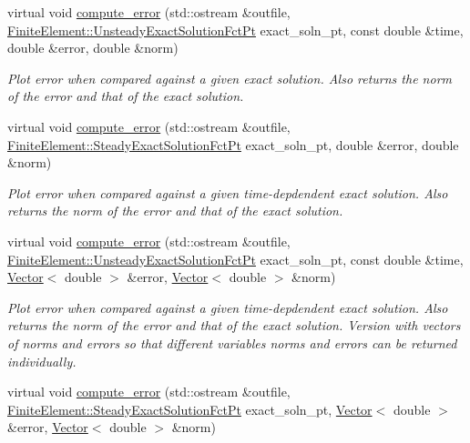 \begin{DoxyCompactItemize}
virtual void \hyperlink{classoomph_1_1Mesh_a7ccc8ea627c4aaeace90c78365b7ea30}{compute\+\_\+error} (std\+::ostream \&outfile, \hyperlink{classoomph_1_1FiniteElement_ad4ecf2b61b158a4b4d351a60d23c633e}{Finite\+Element\+::\+Unsteady\+Exact\+Solution\+Fct\+Pt} exact\+\_\+soln\+\_\+pt, const double \&time, double \&error, double \&norm)
\begin{DoxyCompactList}\small\item\em Plot error when compared against a given exact solution. Also returns the norm of the error and that of the exact solution. \end{DoxyCompactList}\item 
virtual void \hyperlink{classoomph_1_1Mesh_a9488e849a82ef1fc4971013e3661a1ce}{compute\+\_\+error} (std\+::ostream \&outfile, \hyperlink{classoomph_1_1FiniteElement_a690fd33af26cc3e84f39bba6d5a85202}{Finite\+Element\+::\+Steady\+Exact\+Solution\+Fct\+Pt} exact\+\_\+soln\+\_\+pt, double \&error, double \&norm)
\begin{DoxyCompactList}\small\item\em Plot error when compared against a given time-\/depdendent exact solution. Also returns the norm of the error and that of the exact solution. \end{DoxyCompactList}\item 
virtual void \hyperlink{classoomph_1_1Mesh_a13e54320a2c859f9085a8ecd01cc72f0}{compute\+\_\+error} (std\+::ostream \&outfile, \hyperlink{classoomph_1_1FiniteElement_ad4ecf2b61b158a4b4d351a60d23c633e}{Finite\+Element\+::\+Unsteady\+Exact\+Solution\+Fct\+Pt} exact\+\_\+soln\+\_\+pt, const double \&time, \hyperlink{classoomph_1_1Vector}{Vector}$<$ double $>$ \&error, \hyperlink{classoomph_1_1Vector}{Vector}$<$ double $>$ \&norm)
\begin{DoxyCompactList}\small\item\em Plot error when compared against a given time-\/depdendent exact solution. Also returns the norm of the error and that of the exact solution. Version with vectors of norms and errors so that different variables\textquotesingle{} norms and errors can be returned individually. \end{DoxyCompactList}\item 
virtual void \hyperlink{classoomph_1_1Mesh_aaf01468aaed8c208faa4bdb474b9519e}{compute\+\_\+error} (std\+::ostream \&outfile, \hyperlink{classoomph_1_1FiniteElement_a690fd33af26cc3e84f39bba6d5a85202}{Finite\+Element\+::\+Steady\+Exact\+Solution\+Fct\+Pt} exact\+\_\+soln\+\_\+pt, \hyperlink{classoomph_1_1Vector}{Vector}$<$ double $>$ \&error, \hyperlink{classoomph_1_1Vector}{Vector}$<$ double $>$ \&norm)

\end{DoxyCompactItemize}
